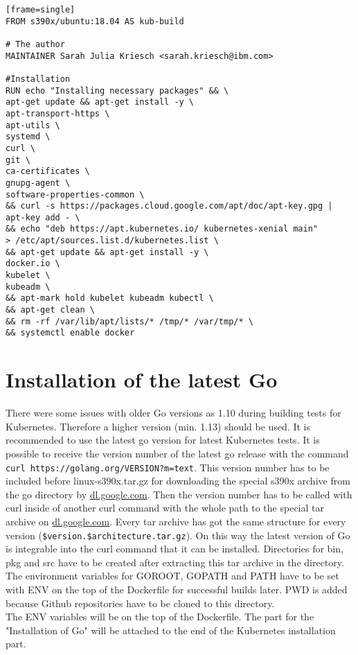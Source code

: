 \begin{verbatim}[frame=single]
FROM s390x/ubuntu:18.04 AS kub-build
 
# The author
MAINTAINER Sarah Julia Kriesch <sarah.kriesch@ibm.com>

#Installation
RUN echo "Installing necessary packages" && \
apt-get update && apt-get install -y \
apt-transport-https \
apt-utils \
systemd \
curl \
git \
ca-certificates \
gnupg-agent \
software-properties-common \
&& curl -s https://packages.cloud.google.com/apt/doc/apt-key.gpg | apt-key add - \
&& echo "deb https://apt.kubernetes.io/ kubernetes-xenial main" 
> /etc/apt/sources.list.d/kubernetes.list \
&& apt-get update && apt-get install -y \
docker.io \
kubelet \
kubeadm \
&& apt-mark hold kubelet kubeadm kubectl \
&& apt-get clean \
&& rm -rf /var/lib/apt/lists/* /tmp/* /var/tmp/* \
&& systemctl enable docker 
\end{verbatim}

\section{Installation of the latest Go}

There were some issues with older Go versions as 1.10 during building tests for Kubernetes. Therefore a higher version (min. 1.13) should be used. It is recommended to use the latest go version for latest Kubernetes tests. It is possible to receive the version number of the latest go release with the command  \lstinline!curl https://golang.org/VERSION?m=text!. This version number has to be included before linux-s390x.tar.gz for downloading the special s390x archive from the go directory by \url{dl.google.com}. Then the version number has to be called with curl inside of another curl command with the whole path to the special tar archive on \url{dl.google.com}. Every tar archive has got the same structure for every version (\lstinline!$version.$architecture.tar.gz!). On this way the latest version of Go is integrable into the curl command that it can be installed. Directories for bin, pkg and src have to be created after extracting this tar archive in the  directory. \\

The environment variables for GOROOT, GOPATH and PATH have to be set with ENV on the top of the Dockerfile for successful builds later. PWD is added because Github repositories have to be cloned to this directory. \\

The ENV variables will be on the top of the Dockerfile. The part for the "Installation of Go" will be attached to the end of the Kubernetes installation part.

